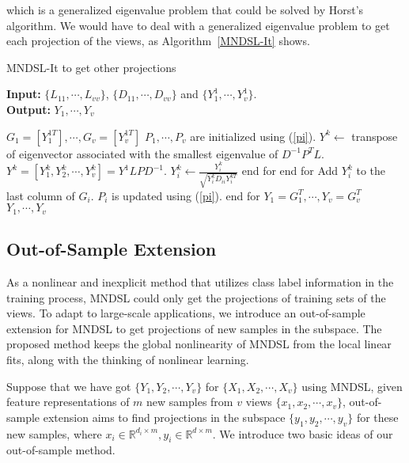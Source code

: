 \documentclass[journal]{IEEEtran}
\begin{document}
which is a generalized eigenvalue problem that could be solved by Horst's algorithm. 
We would have to deal with a generalized eigenvalue problem to get each projection of the views, as Algorithm~\ref{MNDSL-It} shows. 
\begin{algorithm}[t]
\caption{MNDSL-It to get other projections} 
\label{MNDSL-It}
\hspace*{0.02in} {\bf Input:}
$\{L_{11}, \cdots, L_{vv}\}$, $\{D_{11}, \cdots, D_{vv}\}$ and $\{Y_1^1, \cdots, Y_v^1\}$. \\
\hspace*{0.02in} {\bf Output:} 
$Y_1, \cdots, Y_v$
\begin{algorithmic}[1]
\State $G_1=[Y_1^{1T}], \cdots, G_v=[Y_v^{1T}]$
\State $P_1, \cdots, P_v$ are initialized using (\ref{pi}).
\State $Y^k\gets$  transpose of eigenvector associated with the smallest eigenvalue of $D^{-1}P^TL$. 
\State $Y^k=[Y_1^k, Y_2^k, \cdots, Y_v^k] = Y^1 LP D^{-1}$.
\State $Y_i^k \gets \frac{Y_i^k}{\sqrt{Y_i^k D_{ii} Y_i^{kT}}}$
\EndFor
\State end for
\EndFor
\State end for
\State Add $Y_i^k$ to the last column of $G_i$.
\State $P_i$ is updated using (\ref{pi}).
\EndFor
\State end for
\State $Y_1=G_1^T, \cdots, Y_v=G_v^T$
\State \Return $Y_1, \cdots, Y_v$
\end{algorithmic}
\end{algorithm}



\subsection{Out-of-Sample Extension} 
As a nonlinear and inexplicit method that utilizes class label information in the training process, MNDSL could only get the projections of training sets of the views. 
To adapt to large-scale applications, we introduce an out-of-sample extension for MNDSL to get projections of new samples in the subspace. 
The proposed method keeps the global nonlinearity of MNDSL from the local linear fits, along with the thinking of nonlinear learning. 

Suppose that we have got $\{Y_1, Y_2, \cdots, Y_v\}$ for $\{X_1, X_2, \cdots, X_v\}$ using MNDSL, given feature representations of $m$ new samples from $v$ views $\{x_1, x_2, \cdots, x_v \}$, out-of-sample extension aims to find projections in the subspace $\{y_1, y_2, \cdots, y_v \}$ for these new samples, where $x_i\in \mathbb{R}^{d_i\times m}, y_i\in \mathbb{R}^{d\times m}$. 
We introduce two basic ideas of our out-of-sample method. 
\end{document}

